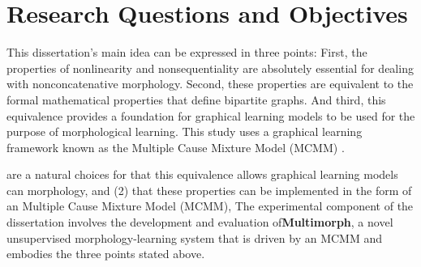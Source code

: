 
\section{Research Questions and Objectives}
This dissertation's main idea can be expressed in three points:
First, the properties of nonlinearity and nonsequentiality are absolutely essential for dealing with nonconcatenative morphology.
Second, these properties are equivalent to the formal mathematical properties that define bipartite graphs. And third, this equivalence provides a foundation for graphical learning models to be used for the purpose of morphological learning. This study uses a graphical learning framework known as the Multiple Cause Mixture Model (MCMM) \citep{saund:1994}.

are a natural choices for  that this equivalence allows graphical learning models can  
morphology, and (2) that these properties can 
be implemented in the form of 
an Multiple Cause Mixture Model (MCMM), 
The experimental component of the dissertation involves the development and evaluation of\textbf{Multimorph}, a novel unsupervised morphology-learning system that is driven by an MCMM and embodies the three points stated above.


